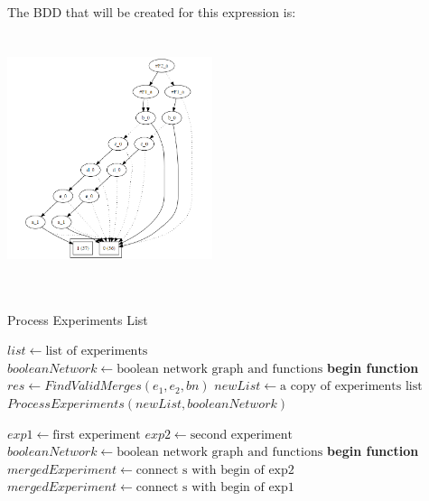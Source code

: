 \documentclass{article}      %
\newcounter{ct}
\begin{document}
The BDD that will be created for this expression is:
\includegraphics[width=6cm, height=8cm]{bdd1.png}
\begin{algorithm} \caption{Process Experiments List}
\begin{algorithmic}[1]
\State $list \gets \text{list of experiments}$
\State $booleanNetwork \gets \text{boolean network graph and functions}$
\State \textbf{begin function}
        \State $res \gets FindValidMerges(e_1, e_2, bn)$
        \State $newList \gets \text{a copy of experiments list}$
        \State {}
        \State {} $ProcessExperiments(newList, booleanNetwork)$
    \EndFor
\EndFunction
\State {}
\end{algorithmic}
\end{algorithm}
\begin{algorithm}
\begin{algorithmic}[1]
\State $exp1 \gets \text{first experiment}$
\State $exp2 \gets \text{second experiment}$
\State $booleanNetwork \gets \text{boolean network graph and functions}$
\State \textbf{begin function}
        \State $mergedExperiment \gets \text{connect s with begin of exp2}$
                \State {}
        \EndIf
    \EndFor
        \State $mergedExperiment \gets \text{connect s with begin of exp1}$
                \State {}
        \EndIf
    \EndFor
\EndFunction
\end{algorithmic}
\end{algorithm}
\end{document}
